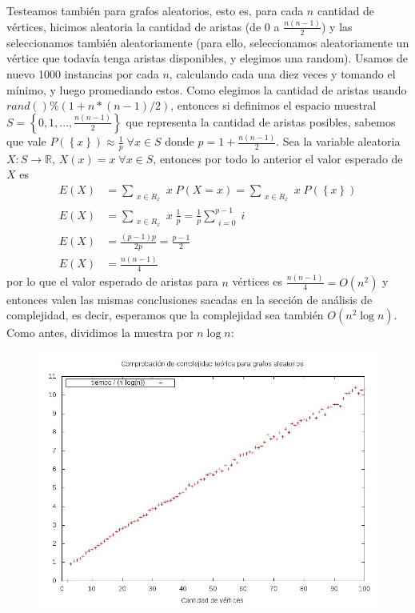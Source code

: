 Testeamos también para grafos aleatorios, esto es, para cada $n$ cantidad de vértices, hicimos aleatoria la cantidad de aristas (de $0$ a $\frac{n(n-1)}{2}$) y las seleccionamos también aleatoriamente (para ello, seleccionamos aleatoriamente un vértice que todavía tenga aristas disponibles, y elegimos una random). Usamos de nuevo 1000 instancias por cada $n$, calculando cada una diez veces y tomando el mínimo, y luego promediando estos. Como elegimos la cantidad de aristas usando $rand() \% (1 + n*(n-1)/2)$, entonces si definimos el espacio muestral $S = \left\{0, 1, ...,\frac{n(n-1)}{2}\right\}$ que representa la cantidad de aristas posibles, sabemos que vale $P(\left\{x\right\}) \approx \frac{1}{p} \; \forall x \in S$ donde $p = 1+\frac{n(n-1)}{2}$. Sea la variable aleatoria $X \colon S \to  \mathbb{R}$, $X(x) = x \; \forall x \in S$, entonces por todo lo anterior el valor esperado de $X$ es
\begin{align*}
E(X) &= \sum\limits_{\substack{x \in R_x}} x \; P(X = x) = \sum\limits_{\substack{x \in R_x}} x \; P(\left\{x\right\}) \\
E(X) &= \sum\limits_{\substack{x \in R_x}} x \; \frac{1}{p} = \frac{1}{p} \sum\limits_{\substack{i = 0}}^{p-1} i \\
E(X) &= \frac{(p-1)p}{2p} = \frac{p-1}{2} \\
E(X) &= \frac{n(n-1)}{4}
\end{align*}
por lo que el valor esperado de aristas para $n$ vértices es $\frac{n(n-1)}{4} = O(n^2)$ y entonces valen las mismas conclusiones sacadas en la sección de análisis de complejidad, es decir, esperamos que la complejidad sea también $O(n^2 \log n)$. Como antes, dividimos la muestra por $n \log n$:
\begin{figure}[H]
	\begin{minipage}[t]{\linewidth}
		\centering
		\includegraphics[width=\textwidth]{p3_complejidad_grafos_aleatorios.jpg}
		\label{fig:p3_complejidad_grafos_aleatorios}
	\end{minipage}
\end{figure}
